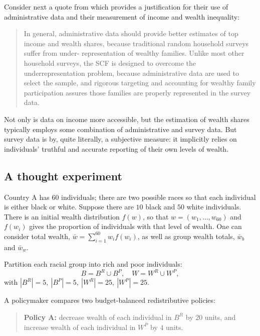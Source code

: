 \documentclass[../../../00-main.tex]{subfiles}
\begin{document}
\par Consider next a quote from \cite{bks16} which provides a justification for their use of administrative data and their measurement of income and wealth inequality:

\begin{quote}

In general, administrative data should provide better estimates of top income and wealth shares, because traditional random household surveys suffer from under- representation of wealthy families. Unlike most other household surveys, the SCF is designed to overcome the underrepresentation problem, because administrative data are used to select the sample, and rigorous targeting and accounting for wealthy family participation assures those families are properly represented in the survey data.

\end{quote}

\par Not only is  data on income more accessible, but the estimation of wealth shares typically employs some combination of administrative and survey data. But survey data is by, quite literally, a subjective measure: it implicitly relies on individuals' truthful and accurate reporting of their own levels of wealth.

\subsection{A thought experiment}

\par Country A has $60$ individuals; there are two possible races so that each individual is either black or white. Suppose there are $10$ black and $50$ white individuals. There is an initial wealth distribution $f(w)$, so that $w=(w_1,\ldots,w_{60})$ and $f(w_i)$ gives the proportion of individuals with that level of wealth. One can consider total wealth, $\bar{w}=\sum_{i=1}^{60} w_i f(w_i)$, as well as group wealth totals, $\bar{w}_b$ and $\bar{w}_w$.

\par Partition each racial group into rich and poor individuals:
\[
B=B^R\cup B^P,\quad W=W^R\cup W^P,
\]
with $|B^R|=5,\ |B^P|=5,\ |W^R|=25,\ |W^P|=25$.

\par A policymaker compares two budget-balanced redistributive policies:

\begin{quote}
\textbf{Policy A:} decrease wealth of each individual in $B^R$ by $20$ units, and increase wealth of each individual in $W^P$ by $4$ units.
\end{quote}
\end{document}
